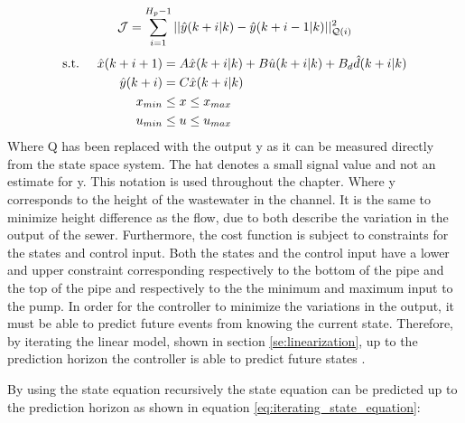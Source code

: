 \begin{equation}\label{eq:cost_function_height}
	 \CMcal{J} = \sum_{i=1}^{H_p-1} || \hat{y}(k+i|k)-\hat{y}(k+i-1|k)||_{\CMcal{Q}(i)}^2
\end{equation}
\begin{equation}\label{eq:state_eq_subject_to}
	\begin{aligned}
	\text{s.t.} \hspace{5mm}  \hat{x}(k+i+1) &= A\hat{x}(k+i|k)+B\hat{u}(k+i|k)+B_d\hat{d}(k+i|k) \\
						      \hat{y}(k+i)&= C\hat{x}(k+i|k) \\
						     x_{min} &\leq  x \leq x_{max} \\
						     u_{min} & \leq u \leq u_{max}
	\end{aligned}
\end{equation}
Where Q has been replaced with the output y as it can be measured directly from the state space system. The hat denotes a small signal value and not an estimate for y. This notation is used throughout the chapter. Where y corresponds to the height of the wastewater in the channel. It is the same to minimize height difference as the flow, due to both describe the variation in the output of the sewer. Furthermore, the cost function is subject to constraints for the states and control input. Both the states and the control input have a lower and upper constraint corresponding respectively to the bottom of the pipe and the top of the pipe and respectively to the the minimum and maximum input to the pump. In order for the controller to minimize the variations in the output, it must be able to predict future events from knowing the current state. Therefore, by iterating the linear model, shown in section \ref{se:linearization}, up to the prediction horizon the controller is able to predict future states \cite{maciejowski2002predictive}.



By using the state equation recursively the state equation can be predicted up to the prediction horizon as shown in equation \ref{eq:iterating_state_equation}: 

